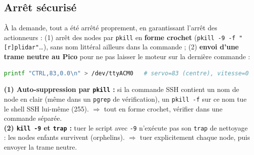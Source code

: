 \documentclass[a4paper,11pt]{article}
\begin{document}
\subsection{Arrêt sécurisé}
À la demande, tout a été arrêté proprement, en garantissant l'arrêt des
actionneurs : (1) arrêt des nodes par \texttt{pkill} en \textbf{forme crochet}
(\texttt{pkill -9 -f "[r]plidar"}\ldots), sans nom littéral ailleurs dans la
commande ; (2) \textbf{envoi d'une trame neutre au Pico} pour ne pas laisser le
moteur sur la dernière commande :
\begin{lstlisting}[language=bash]
printf "CTRL,83,0.0\n" > /dev/ttyACM0   # servo=83 (centre), vitesse=0
\end{lstlisting}
\begin{tcolorbox}[colback=lightorange,colframe=warning,title=Deux pièges à l'arrêt]
\textbf{(1) Auto-suppression par \texttt{pkill} :} si la commande SSH contient un
nom de node en clair (même dans un \texttt{pgrep} de vérification), un
\texttt{pkill -f} sur ce nom tue le shell SSH lui-même (255). $\Rightarrow$ tout
en forme crochet, vérifier dans une commande séparée.\\
\textbf{(2) \texttt{kill -9} et \texttt{trap} :} tuer le script avec \texttt{-9}
n'exécute pas son \texttt{trap} de nettoyage : les nodes enfants survivent
(orphelins). $\Rightarrow$ tuer explicitement chaque node, puis envoyer la trame
neutre.
\end{tcolorbox}

\end{document}

